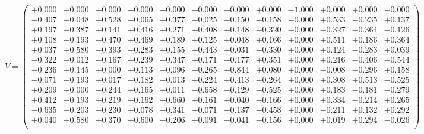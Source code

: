 \documentclass[9pt]{article}
\theoremstyle{plain}
\theoremstyle{definition}
\theoremstyle{remark}
\numberwithin{equation}{section}
\begin{document}
$V = \left(
\begin{array}{
cccccccccccc}
+0.000 & +0.000 & +0.000 & -0.000 & -0.000 & -0.000 & -0.000 & +0.000 & -1.000 & +0.000 & +0.000 & -0.000 \\
-0.407 & -0.048 & +0.528 & -0.065 & +0.377 & -0.025 & -0.150 & -0.158 & -0.000 & +0.533 & -0.235 & +0.137 \\
+0.197 & -0.387 & +0.141 & +0.416 & +0.271 & +0.408 & +0.148 & -0.320 & -0.000 & -0.327 & -0.364 & -0.126 \\
+0.108 & -0.193 & -0.470 & +0.469 & +0.189 & +0.125 & +0.048 & +0.166 & +0.000 & +0.511 & +0.186 & +0.364 \\
+0.037 & +0.580 & -0.393 & -0.283 & +0.155 & +0.443 & +0.031 & -0.330 & +0.000 & +0.124 & -0.283 & +0.039 \\
-0.322 & -0.012 & -0.167 & +0.239 & -0.347 & +0.171 & -0.177 & +0.351 & +0.000 & +0.216 & -0.406 & -0.544 \\
-0.236 & +0.145 & +0.000 & +0.113 & -0.096 & -0.265 & +0.844 & +0.080 & +0.000 & -0.008 & -0.296 & +0.158 \\
-0.071 & -0.193 & +0.017 & -0.182 & -0.013 & +0.224 & +0.413 & -0.264 & +0.000 & +0.308 & +0.513 & -0.525 \\
+0.209 & +0.000 & -0.244 & +0.165 & +0.011 & -0.658 & -0.129 & -0.525 & +0.000 & +0.183 & -0.181 & -0.279 \\
+0.412 & -0.193 & +0.219 & -0.162 & -0.660 & +0.161 & +0.040 & -0.166 & +0.000 & +0.334 & -0.214 & +0.265 \\
-0.635 & -0.203 & -0.230 & +0.078 & -0.341 & +0.071 & -0.137 & -0.458 & +0.000 & -0.211 & +0.132 & +0.292 \\
+0.040 & +0.580 & +0.370 & +0.600 & -0.206 & +0.091 & -0.041 & -0.156 & +0.000 & +0.019 & +0.294 & -0.026 \\
\end{array}
\right)$ \newline 
\end{document}

